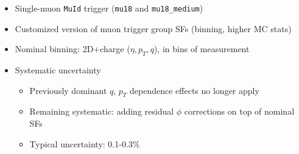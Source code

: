 
{

\begin{itemize}
\item Single-muon \texttt{MuId} trigger (\texttt{mu18} and \texttt{mu18\_medium})
\item Customized version of muon trigger group SFs (binning, higher MC stats)
\item Nominal binning: 2D+charge ($\eta,p_T,q$), in bins of measurement
\item Systematic uncertainty
\begin{itemize}
\item Previously dominant $q$, $p_T$ dependence effects no longer apply
\item Remaining systematic: adding residual $\phi$ corrections on top of nominal SFs
\item Typical uncertainty: 0.1-0.3\%
\end{itemize}
\end{itemize}

\vspace{-0.5cm}

\begin{figure}
  \centering
\end{figure}

}



